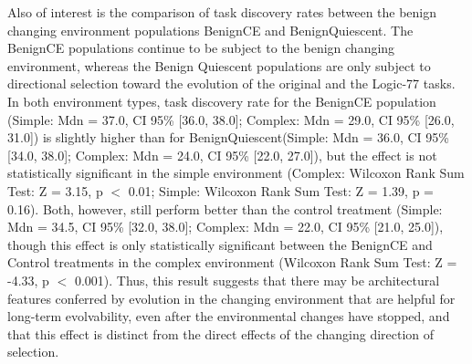 \documentclass[PhD]{msu-thesis}
\begin{document}
Also of interest
is the comparison of task discovery rates between the benign changing environment populations BenignCE and BenignQuiescent. The BenignCE populations continue to be subject to the benign changing environment, whereas the Benign Quiescent populations are only subject to directional selection toward the evolution of the original and the Logic-77 tasks. In both environment types, task discovery rate for the BenignCE population (Simple: Mdn = 37.0, CI 95\% [36.0, 38.0]; Complex: Mdn = 29.0, CI 95\% [26.0, 31.0]) is slightly higher than for BenignQuiescent(Simple: Mdn = 36.0, CI 95\% [34.0, 38.0]; Complex: Mdn = 24.0, CI 95\% [22.0, 27.0]), but the effect is not statistically significant in the simple environment (Complex: Wilcoxon Rank Sum Test: Z = 3.15, p $<$ 0.01; Simple: Wilcoxon Rank Sum Test: Z = 1.39, p = 0.16). Both, however, still perform better than the control treatment (Simple: Mdn = 34.5, CI 95\% [32.0, 38.0]; Complex: Mdn = 22.0, CI 95\% [21.0, 25.0]), though this effect is only statistically significant between the BenignCE and Control treatments in the complex environment (Wilcoxon Rank Sum Test: Z = -4.33, p $<$ 0.001). Thus, this result suggests that there may be architectural features conferred by evolution in the changing environment that are helpful for long-term evolvability, even after the environmental changes have stopped, and that this effect is distinct from the direct effects of the changing direction of selection. %

\end{document}
